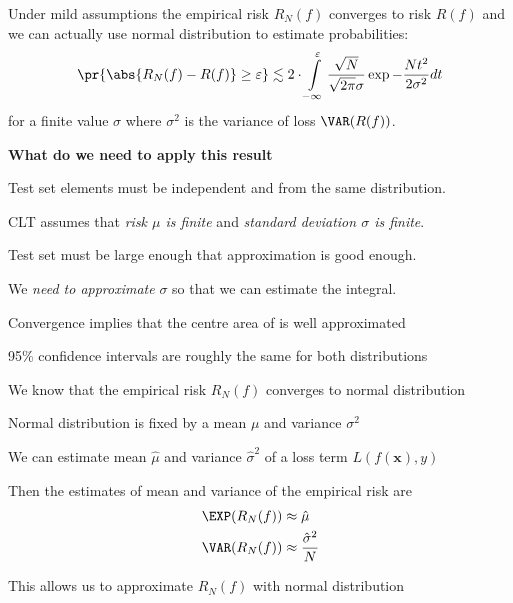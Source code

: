 \documentclass[landscape,footrule]{foils}
\renewcommand{\vec}[1]{\boldsymbol{#1}}
\begin{document}





Under mild assumptions the empirical risk $R_N(f)$ converges to risk $R(f)$ and we can actually use normal distribution to estimate probabilities:
\begin{align*}
\pr{\abs{R_N(f)-R(f)}\geq \varepsilon} \lesssim 2\cdot \int\limits_{-\infty}^\varepsilon\frac{\sqrt{N}}{\sqrt{2\pi}\sigma}\exp{-\frac{N t^2}{2 \sigma^2}}dt
\end{align*}
for a finite value $\sigma$ where $\sigma^2$ is the variance of loss $\VAR(R(f))$.
\vspace*{0cm}

\textbf{What do we need to apply this result}
\begin{triangles}
\item Test set elements must be independent and from the same distribution. 
\item CLT assumes that \emph{risk $\mu$ is finite} and \emph{standard deviation $\sigma$ is finite}.
\item Test set must be large enough that approximation is good enough.
\item We \emph{need to approximate} $\sigma$\vspace*{-1ex} so that we can estimate the integral.
\end{triangles}




\vspace*{-0.5cm}

Convergence implies that the centre area of is well approximated 
\begin{triangles}
\item 95\% confidence intervals are roughly the same for both distributions
\end{triangles}



We know that the empirical risk $R_N(f)$ converges to normal distribution
\begin{triangles}
\item Normal distribution is fixed by a mean $\mu$ and variance $\sigma^2$
\item We can estimate mean $\hat{\mu}$ and variance $\hat{\sigma}^2$ of a loss term $L(f(\vec{x}), y)$ 
\item Then the estimates of mean and variance of the empirical risk are
\begin{align*}
\EXP(R_N(f))&\approx \hat{\mu}\\
\VAR(R_N(f))&\approx \frac{\hat{\sigma}^2}{N}
\end{align*}
\item This allows us to approximate $R_N(f)$ with normal distribution 
\end{triangles}
\end{document}
